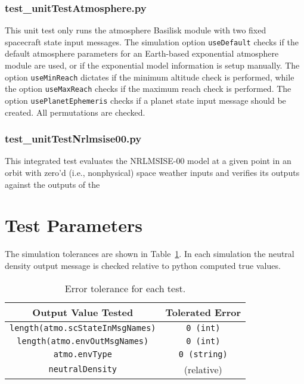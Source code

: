 \subsubsection{test\_unitTestAtmosphere.py}
This unit test only runs the atmosphere Basilisk module with two fixed spacecraft state input messages.  The simulation option {\tt useDefault} checks if the default atmosphere parameters for an Earth-based exponential atmosphere module are used, or if the exponential model information is setup manually.  The option {\tt useMinReach} dictates if the minimum altitude check is performed, while the option {\tt useMaxReach} checks if the maximum reach check is performed.  The option {\tt usePlanetEphemeris} checks if a planet state input message should be created.  All permutations are checked.

\subsubsection{test\_unitTestNrlmsise00.py}
This integrated test evaluates the NRLMSISE-00 model at a given point in an orbit with zero'd (i.e., nonphysical) space weather inputs and verifies its outputs against the outputs of the 

\section{Test Parameters}
The simulation tolerances are shown in Table~\ref{tab:errortol}.  In each simulation the neutral density output message is checked relative to python computed true values.  
\begin{table}[htbp]
	\caption{Error tolerance for each test.}
	\label{tab:errortol}
	\centering \fontsize{10}{10}\selectfont
	\begin{tabular}{ c | c } %
		\hline\hline
		\textbf{Output Value Tested}  & \textbf{Tolerated Error}  \\ 
		\hline
		{\tt length(atmo.scStateInMsgNames)}        & {\tt 0 (int)}   \\
		{\tt length(atmo.envOutMsgNames)}        & {\tt 0 (int)}   \\ 
		{\tt atmo.envType}        & {\tt 0 (string)}   \\ 
		{\tt neutralDensity}        &  (relative) \\ 
		\hline\hline
	\end{tabular}
\end{table}




